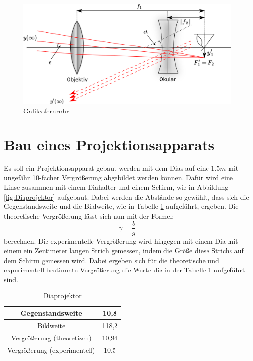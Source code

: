 \begin{figure}
    \centering
    \includegraphics[scale=0.8]{Geometrische_Optik/Protokoll/fig/Galileofernrohr.png}
    \caption{Galileofernrohr}
    \label{fig:Galileofernrohr}
\end{figure}

\section{Bau eines Projektionsapparats}

Es soll ein Projektionsapparat gebaut werden mit dem Dias auf eine $1.5m$ mit ungefähr 10-facher Vergrößerung abgebildet werden können. Dafür wird eine Linse zusammen mit einem Diahalter und einem Schirm, wie in Abbildung \ref{fig:Diaprojektor} aufgebaut. Dabei werden die Abstände so gewählt, dass sich die Gegenstandsweite und die Bildweite, wie in Tabelle \ref{tab:Diaprojektor} aufgeführt, ergeben. Die theoretische Vergrößerung lässt sich nun mit der Formel: $$ \gamma = \frac{b}{g} $$ berechnen. Die experimentelle Vergrößerung wird hingegen mit einem Dia mit einem ein Zentimeter langen Strich gemessen, indem die Größe diese Strichs auf dem Schirm gemessen wird. Dabei ergeben sich für die theoretische und experimentell bestimmte Vergrößerung die Werte die in der Tabelle \ref{tab:Diaprojektor} aufgeführt sind.

\begin{table}[]
    \centering
    \begin{tabular}{|c|c|}
	\hline
	Gegenstandsweite & 10,8 \\
	\hline
	Bildweite & 118,2 \\
	\hline
	Vergrößerung (theoretisch) & 10,94 \\
	\hline
	Vergrößerung (experimentell) & 10.5 \\
	\hline
\end{tabular}
    \caption{Diaprojektor}
    \label{tab:Diaprojektor}
\end{table}


